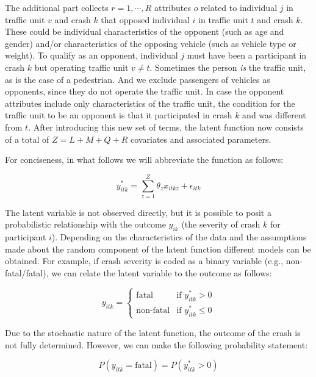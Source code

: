 \documentclass[]{elsarticle} %
\begin{document}
The additional part collects \(r=1,\cdots,R\) attributes \(o\) related
to individual \(j\) in traffic unit \(v\) and crash \(k\) that opposed
individual \(i\) in traffic unit \(t\) and crash \(k\). These could be
individual characteristics of the opponent (such as age and gender)
and/or characteristics of the opposing vehicle (such as vehicle type or
weight). To qualify as an opponent, individual \(j\) must have been a
participant in crash \(k\) but operating traffic unit \(v\ne t\).
Sometimes the person \emph{is} the traffic unit, as is the case of a
pedestrian. And we exclude passengers of vehicles as opponents, since
they do not operate the traffic unit. In case the opponent attributes
include only characteristics of the traffic unit, the condition for the
traffic unit to be an opponent is that it participated in crash \(k\)
and was different from \(t\). After introducing this new set of terms,
the latent function now consists of a total of \(Z=L+M+Q+R\) covariates
and associated parameters.

For conciseness, in what follows we will abbreviate the function as
follows:

\begin{equation}
\label{eq:latent-function-compact}
y_{itk}^*=\sum_{z=1}^Z\theta_zx_{itkz} + \epsilon_{itk}
\end{equation}

The latent variable is not observed directly, but it is possible to
posit a probabilistic relationship with the outcome \(y_{ik}\) (the
severity of crash \(k\) for participant \(i\)). Depending on the
characteristics of the data and the assumptions made about the random
component of the latent function different models can be obtained. For
example, if crash severity is coded as a binary variable (e.g.,
non-fatal/fatal), we can relate the latent variable to the outcome as
follows:

\begin{equation}
\label{eq:latent-function-2-outcomes}
y_{itk} = 
\begin{cases}
\text{fatal} & \text{if } y_{itk}^*>0\\
\text{non-fatal} & \text{if } y_{itk}^*\leq0
\end{cases}
\end{equation}

Due to the stochastic nature of the latent function, the outcome of the
crash is not fully determined. However, we can make the following
probability statement:

\begin{equation}
\label{eq:probability-2-outcomes}
P(y_{itk} = \text{fatal}) = P(y_{itk}^* > 0)
\end{equation}
\end{document}
